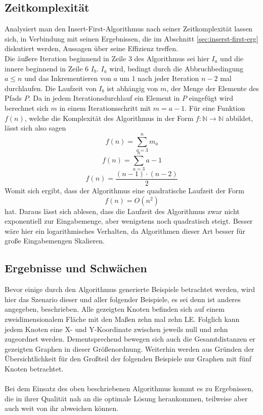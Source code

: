 \subsection{Zeitkomplexität}\label{sec:time-comp-first}
Analysiert man den Insert-First-Algorithmus nach seiner Zeitkomplexität lassen sich, in Verbindung mit seinen Ergebnissen, die im Abschnitt \vref{sec:inserst-first-erg} diskutiert werden, Aussagen über seine Effizienz treffen.
\\
Die äußere Iteration beginnend in Zeile 3 des Algorithmus sei hier $I_a$ und die innere beginnend in Zeile 6 $I_b$.
$I_a$ wird, bedingt durch die Abbruchbedingung $a\leq n$ und das Inkrementieren von $a$ um $1$ nach jeder Iteration $n-2$ mal durchlaufen.
Die Laufzeit von $I_b$ ist abhängig von $m$, der Menge der Elemente des Pfads $P$.
Da in jedem Iterationsdurchlauf ein Element in $P$ eingefügt wird berechnet sich $m$ in einem Iterationsschritt mit $m=a-1$.
Für eine Funktion $f(n)$, welche die Komplexität des Algorithmus in der Form $f: \mathbb{N} \rightarrow \mathbb{N}$ abbildet, lässt sich also sagen
$$f(n) = \sum_{a = 3}^n m_a$$
$$f(n) = \sum_{a=3}^n a - 1$$
$$f(n) = \frac{(n-1)\cdot (n-2)}{2}$$
Womit sich ergibt, dass der Algorithmus eine quadratische Laufzeit der Form
$$f(n) = O(n^2)$$
hat.
Daraus lässt sich ablesen, dass die Laufzeit des Algorithmus zwar nicht exponentiell zur Eingabemenge, aber wenigstens noch quadratisch steigt.
Besser wäre hier ein logarithmisches Verhalten, da Algorithmen dieser Art besser für große Eingabemengen Skalieren.\autocite[S. 9ff.]{Gurski.2010}


\subsection{Ergebnisse und Schwächen} \label{sec:inserst-first-erg}
Bevor einige durch den Algorithmus generierte Beispiele betrachtet werden, wird hier das Szenario dieser und aller folgender Beispiele, es sei denn ist anderes angegeben, beschrieben.
Alle gezeigten Knoten befinden sich auf einem zweidimensionalem Fläche mit den Maßen zehn mal zehn \ac{LE}.
Folglich kann jedem Knoten eine X- und Y-Koordinate zwischen jeweils null und zehn zugeordnet werden. 
Dementsprechend bewegen sich auch die Gesamtdistanzen er gezeigten Graphen in dieser Größenordnung.
Weiterhin werden aus Gründen der Übersichtlichkeit für den Großteil der folgenden Beispiele nur Graphen mit fünf Knoten betrachtet.
\\\\
Bei dem Einsatz des oben beschriebenen Algorithmus kommt es zu Ergebnissen, die in ihrer Qualität nah an die optimale Lösung herankommen, teilweise aber auch weit von ihr abweichen können.  

